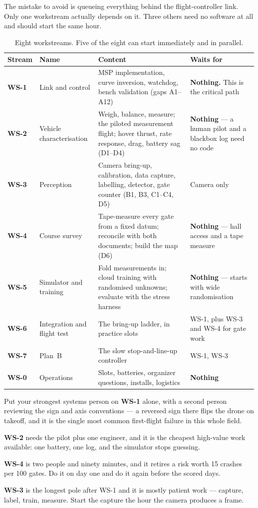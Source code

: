 The mistake to avoid is queueing everything behind the flight-controller link. Only one workstream
actually depends on it. Three others need no software at all and should start the same hour.

\begin{table}[H]\centering\footnotesize
\begin{tabularx}{\linewidth}{@{}p{1.1cm} p{3.0cm} X p{2.4cm}@{}}
\toprule
Stream & Name & Content & Waits for \\
\midrule
\textbf{WS-1} & Link and control & MSP implementation, curve inversion, watchdog, bench validation (gaps A1--A12) & \textbf{Nothing.} This is the critical path \\
\textbf{WS-2} & Vehicle characterisation & Weigh, balance, measure; the piloted measurement flight; hover thrust, rate response, drag, battery sag (D1--D4) & \textbf{Nothing} --- a human pilot and a blackbox log need no code \\
\textbf{WS-3} & Perception & Camera bring-up, calibration, data capture, labelling, detector, gate counter (B1, B3, C1--C4, D5) & Camera only \\
\textbf{WS-4} & Course survey & Tape-measure every gate from a fixed datum; reconcile with both documents; build the map (D6) & \textbf{Nothing} --- hall access and a tape measure \\
\textbf{WS-5} & Simulator and training & Fold measurements in; cloud training with randomised unknowns; evaluate with the stress harness & \textbf{Nothing} --- starts with wide randomisation \\
\textbf{WS-6} & Integration and flight test & The bring-up ladder, in practice slots & WS-1, plus WS-3 and WS-4 for gate work \\
\textbf{WS-7} & Plan~B & The slow stop-and-line-up controller & WS-1, WS-3 \\
\textbf{WS-0} & Operations & Slots, batteries, organizer questions, installs, logistics & \textbf{Nothing} \\
\bottomrule
\end{tabularx}
\caption{Eight workstreams. Five of the eight can start immediately and in parallel.}
\end{table}

\begin{takeaway}
Put your strongest systems person on \textbf{WS-1} alone, with a second person reviewing the sign
and axis conventions --- a reversed sign there flips the drone on takeoff, and it is the single most
common first-flight failure in this whole field.

\textbf{WS-2} needs the pilot plus one engineer, and it is the cheapest high-value work available:
one battery, one log, and the simulator stops guessing.

\textbf{WS-4} is two people and ninety minutes, and it retires a risk worth 15 crashes per 100
gates. Do it on day one and do it again before the scored days.

\textbf{WS-3} is the longest pole after WS-1 and it is mostly patient work --- capture, label, train,
measure. Start the capture the hour the camera produces a frame.
\end{takeaway}


